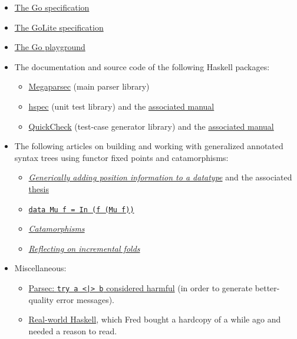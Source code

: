 \documentclass[letterpaper,11pt]{article}
\begin{document}
\begin{itemize}
\item \href{https://golang.org/ref/spec}{The Go specification}
\item \href{http://www.sable.mcgill.ca/~hendren/520/2016/assignments/syntax.pdf}{The GoLite specification}
\item \href{https://play.golang.org/}{The Go playground}
\item The documentation and source code of the following Haskell packages:
	\begin{itemize}
	\item \href{https://hackage.haskell.org/package/megaparsec-4.3.0}{Megaparsec} (main parser library)
	\item \href{https://hackage.haskell.org/package/hspec}{hspec} (unit test library) and the \href{http://hspec.github.io/}{associated manual}
	\item \href{https://hackage.haskell.org/package/QuickCheck-2.8.2}{QuickCheck} (test-case generator library) and the \href{http://www.cse.chalmers.se/~rjmh/QuickCheck/manual.html}{associated manual}
	\end{itemize}
\item The following articles on building and working with generalized annotated syntax trees using functor fixed points and catamorphisms:
	\begin{itemize}
	\item \href{http://martijn.van.steenbergen.nl/journal/2010/06/24/generically-adding-position-information-to-a-datatype/}{\textit{Generically adding position information to a datatype}} and the associated \href{http://martijn.van.steenbergen.nl/projects/Selections.pdf}{thesis}
	\item \href{http://blog.plover.com/prog/springschool95-2.html}{\texttt{data Mu f = In (f (Mu f))}}
	\item \href{https://www.schoolofhaskell.com/user/edwardk/recursion-schemes/catamorphisms}{\textit{Catamorphisms}}
	\item \href{http://comonad.com/reader/2009/incremental-folds/}{\textit{Reflecting on incremental folds}}
	\end{itemize}
\item Miscellaneous:
	\begin{itemize}
	\item \href{http://blog.ezyang.com/2014/05/parsec-try-a-or-b-considered-harmful/}{Parsec: \texttt{try a <|> b} considered harmful} (in order to generate better-quality error messages).
	\item
	\href{http://book.realworldhaskell.org/read}{Real-world Haskell}, which Fred bought a hardcopy of a while ago and needed a reason to read.
	\end{itemize}
\end{itemize}
\end{document}
